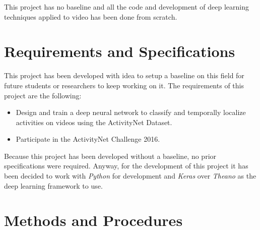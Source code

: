 
This project has no baseline and all the code and development of deep learning techniques applied to video has been done from scratch.

\section{Requirements and Specifications}

This project has been developed with idea to setup a baseline on this field for future students or researchers to keep working on it. The requirements of this project are the following:
\begin{itemize}
    \item Design and train a deep neural network to classify and temporally localize activities on videos using the ActivityNet Dataset.
    \item Participate in the ActivityNet Challenge 2016.
\end{itemize}


Because this project has been developed without a baseline, no prior specifications were required. Anyway, for the development of this project it has been decided to work with \textit{Python} for development and \textit{Keras} over \textit{Theano}\cite{theano2016theano} as the deep learning framework to use.


\section{Methods and Procedures}

